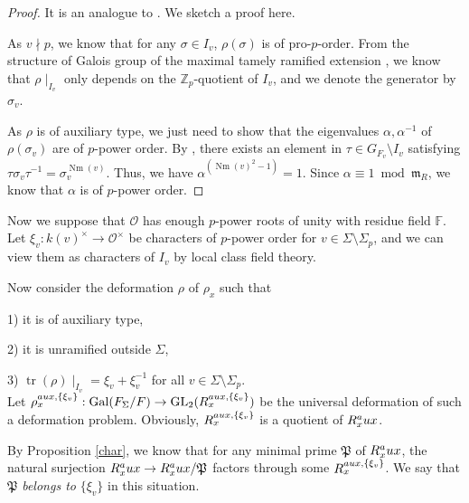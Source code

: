 \documentclass[12pt]{amsart}
\theoremstyle{plain}
\theoremstyle{definition}
\theoremstyle{remark}
\begin{document}
 \begin{proof}
 	It is an analogue to \cite[Corollary 5.7.2]{pan2022fontaine}. We sketch a proof here.
 	
 	As $v \nmid p$, we know that for any $\sigma \in I_v$, $\rho(\sigma) $ is of pro-$p$-order. From the structure of Galois group of the maximal tamely ramified extension \cite[Proposition 7.5.2]{neukirch2013cohomology}, we know that $\rho \mid_{I_v}$ only depends on the $\mathbb{Z}_p$-quotient of $I_v $, and we denote the generator by $\sigma_v$.
 	
 	As $\rho$ is of auxiliary type, we just need to show that the eigenvalues $\alpha, \alpha^{-1}$ of $\rho(\sigma_v)$ are of $p$-power order. By \cite[Theorem 7.5.3]{neukirch2013cohomology}, there exists an element in $\tau \in G_{F_v} \setminus I_v$ satisfying $\tau \sigma_v \tau^{-1}=\sigma_v^{\operatorname{Nm}(v)}$. Thus, we have $\alpha^{(\operatorname{Nm}(v)^2-1)}=1$. Since $\alpha \equiv 1 ~\operatorname{mod}~\mathfrak{m}_R$, we know that $\alpha$ is of $p$-power order.
 \end{proof}
 
 Now we suppose that $\mathcal{O}$ has enough $p$-power roots of unity with residue field $\mathbb{F}$. Let $\xi_v: k(v)^\times \to \mathcal{O}^\times$ be characters of $p$-power order for $v \in \Sigma \setminus \Sigma_p$, and we can view them as characters of $I_v$ by local class field theory.
 
 Now consider the deformation $\rho$ of $\rho_x$ such that 
 
 1) it is of auxiliary type,
 
 2) it is unramified outside $\Sigma$,
 
 3) $\operatorname{tr}(\rho) \mid_{I_v}= \xi_v+\xi_v^{-1}$ for all $v \in \Sigma \setminus \Sigma_p$.
 \\
 Let $\rho_x^{\textnormal{aux}, \{\xi_v\}}: \operatorname{Gal}(F_{\Sigma}/F) \to \operatorname{GL}_2(R_x^{\textnormal{aux}, \{\xi_v\}})$ be the universal deformation of such a deformation problem. Obviously, $ R_x^{\textnormal{aux}, \{\xi_v\}}$ is a quotient of $R_x^\textnormal{aux}$. %
 
 By Proposition \ref{char}, we know that for any minimal prime $\mathfrak{P}$ of $R_x^\textnormal{aux}$, the natural surjection $ R_x^\textnormal{aux} \to R_x^\textnormal{aux}/ \mathfrak{P}$ factors through some $ R_x^{\textnormal{aux}, \{\xi_v\}}$. We say that $ \mathfrak{P}$ \textit{belongs to} $\{\xi_v\}$ in this situation.
 
\end{document}
